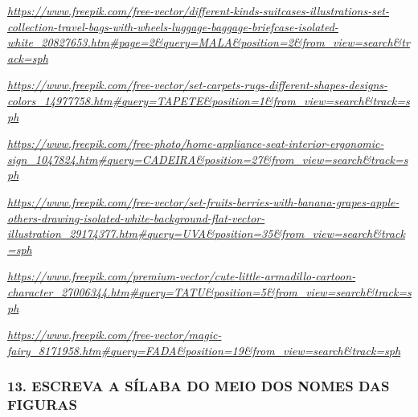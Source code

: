 \href{https://www.freepik.com/free-vector/different-kinds-suitcases-illustrations-set-collection-travel-bags-with-wheels-luggage-baggage-briefcase-isolated-white_20827653.htm\#page=2\&query=MALA\&position=2\&from_view=search\&track=sph}{\emph{https://www.freepik.com/free-vector/different-kinds-suitcases-illustrations-set-collection-travel-bags-with-wheels-luggage-baggage-briefcase-isolated-white\_20827653.htm\#page=2\&query=MALA\&position=2\&from\_view=search\&track=sph}}

\href{https://www.freepik.com/free-vector/set-carpets-rugs-different-shapes-designs-colors_14977758.htm\#query=TAPETE\&position=1\&from_view=search\&track=sph}{\emph{https://www.freepik.com/free-vector/set-carpets-rugs-different-shapes-designs-colors\_14977758.htm\#query=TAPETE\&position=1\&from\_view=search\&track=sph}}

\href{https://www.freepik.com/free-photo/home-appliance-seat-interior-ergonomic-sign_1047824.htm\#query=CADEIRA\&position=27\&from_view=search\&track=sph}{\emph{https://www.freepik.com/free-photo/home-appliance-seat-interior-ergonomic-sign\_1047824.htm\#query=CADEIRA\&position=27\&from\_view=search\&track=sph}}

\href{https://www.freepik.com/free-vector/set-fruits-berries-with-banana-grapes-apple-others-drawing-isolated-white-background-flat-vector-illustration_29174377.htm\#query=UVA\&position=35\&from_view=search\&track=sph}{\emph{https://www.freepik.com/free-vector/set-fruits-berries-with-banana-grapes-apple-others-drawing-isolated-white-background-flat-vector-illustration\_29174377.htm\#query=UVA\&position=35\&from\_view=search\&track=sph}}

\href{https://www.freepik.com/premium-vector/cute-little-armadillo-cartoon-character_27006344.htm\#query=TATU\&position=5\&from_view=search\&track=sph}{\emph{https://www.freepik.com/premium-vector/cute-little-armadillo-cartoon-character\_27006344.htm\#query=TATU\&position=5\&from\_view=search\&track=sph}}

\href{https://www.freepik.com/free-vector/magic-fairy_8171958.htm\#query=FADA\&position=19\&from_view=search\&track=sph}{\emph{https://www.freepik.com/free-vector/magic-fairy\_8171958.htm\#query=FADA\&position=19\&from\_view=search\&track=sph}}

\subsubsection{13. ESCREVA A SÍLABA DO MEIO DOS NOMES DAS
FIGURAS}\label{escreva-a-suxedlaba-do-meio-dos-nomes-das-figuras}

